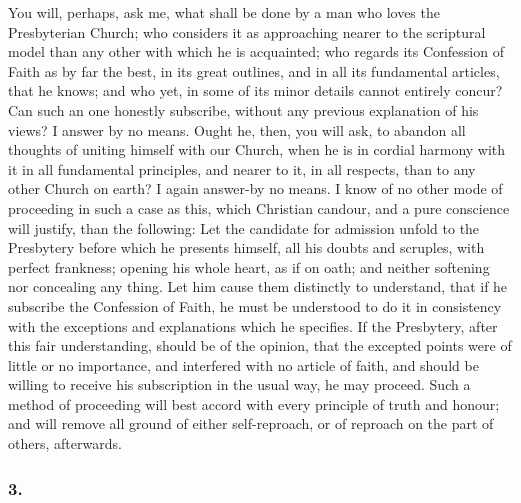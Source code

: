 \documentclass[
]{book}
\begin{document}
You will, perhaps, ask me, what shall be done by a man who loves the Presbyterian Church; who considers it as approaching nearer to the scriptural model than any other with which he is acquainted; who regards its Confession of Faith as by far the best, in its great outlines, and in all its fundamental articles, that he knows; and who yet, in some of its minor details cannot entirely concur? Can such an one honestly subscribe, without any previous explanation of his views? I answer by no means. Ought he, then, you will ask, to abandon all thoughts of uniting himself with our Church, when he is in cordial harmony with it in all fundamental principles, and nearer to it, in all respects, than to any other Church on earth? I again answer-by no means. I know of no other mode of proceeding in such a case as this, which Christian candour, and a pure conscience will justify, than the following: Let the candidate for admission unfold to the Presbytery before which he presents himself, all his doubts and scruples, with perfect frankness; opening his whole heart, as if on oath; and neither softening nor concealing any thing. Let him cause them distinctly to understand, that if he subscribe the Confession of Faith, he must be understood to do it in consistency with the exceptions and explanations which he specifies. If the Presbytery, after this fair understanding, should be of the opinion, that the excepted points were of little or no importance, and interfered with no article of faith, and should be willing to receive his subscription in the usual way, he may proceed. Such a method of proceeding will best accord with every principle of truth and honour; and will remove all ground of either self-reproach, or of reproach on the part of others, afterwards.

\hypertarget{section-14}{%
\subsubsection*{3.}\label{section-14}}
\end{document}
